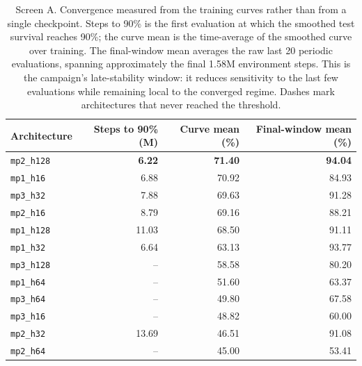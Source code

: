 \begin{table}[H]
  \centering
  \small
  \caption{Screen A. Convergence measured from the training curves rather than
  from a single checkpoint. Steps to 90\% is the first evaluation at which the
  smoothed test survival reaches 90\%; the curve mean is the time-average of
  the smoothed curve over training. The final-window mean averages the raw last
  20 periodic evaluations, spanning approximately the final 1.58M environment
  steps. This is the campaign's late-stability window: it reduces sensitivity
  to the last few evaluations while remaining local to the converged regime.
  Dashes mark architectures that never reached the threshold.}
  \label{tab:depth-width-convergence}
  \setlength{\tabcolsep}{5pt}
  \begin{tabular}{lrrr}
    \toprule
    Architecture & Steps to 90\% (M) & Curve mean (\%) & Final-window mean (\%) \\
    \midrule
    \texttt{mp2\_h128} & \textbf{6.22} & \textbf{71.40} & \textbf{94.04} \\
    \texttt{mp1\_h16} & 6.88 & 70.92 & 84.93 \\
    \texttt{mp3\_h32} & 7.88 & 69.63 & 91.28 \\
    \texttt{mp2\_h16} & 8.79 & 69.16 & 88.21 \\
    \texttt{mp1\_h128} & 11.03 & 68.50 & 91.11 \\
    \texttt{mp1\_h32} & 6.64 & 63.13 & 93.77 \\
    \texttt{mp3\_h128} & -- & 58.58 & 80.20 \\
    \texttt{mp1\_h64} & -- & 51.60 & 63.37 \\
    \texttt{mp3\_h64} & -- & 49.80 & 67.58 \\
    \texttt{mp3\_h16} & -- & 48.82 & 60.00 \\
    \texttt{mp2\_h32} & 13.69 & 46.51 & 91.08 \\
    \texttt{mp2\_h64} & -- & 45.00 & 53.41 \\
    \bottomrule
  \end{tabular}
\end{table}

